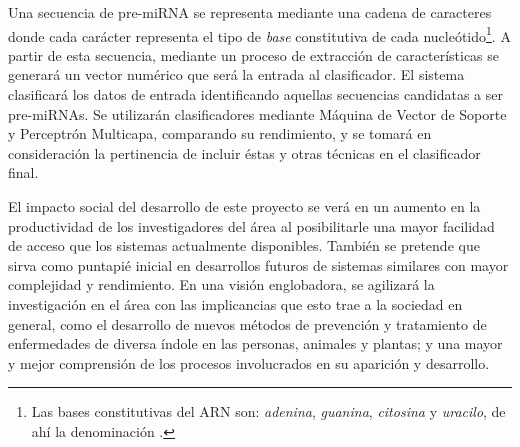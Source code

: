\documentclass[12pt,bibliography=oldstyle,DIV=12,parskip=full-,titlepage]{scrartcl}
\begin{document}
\newpage
Una secuencia de pre-miRNA se representa mediante una cadena de
caracteres  donde cada carácter representa el tipo
de \emph{base} constitutiva de cada nucleótido\footnote{Las bases
  constitutivas del ARN son: \emph{adenina}, \emph{guanina},
  \emph{citosina} y \emph{uracilo}, de ahí la denominación .}.
A partir de esta secuencia, mediante un proceso de extracción de
características se generará un vector numérico que será la entrada al
clasificador.  El sistema clasificará los datos de entrada
identificando aquellas secuencias candidatas a ser pre-miRNAs.  Se
utilizarán clasificadores mediante Máquina de Vector de Soporte y
Perceptrón Multicapa, comparando su rendimiento, y se tomará en
consideración la pertinencia de incluir éstas y otras técnicas en el
clasificador final.



%
El impacto social del desarrollo de este proyecto se verá en un
aumento en la productividad de los investigadores del área al
posibilitarle una mayor facilidad de acceso que los sistemas actualmente
disponibles. También se pretende que sirva como puntapié inicial en
desarrollos futuros de sistemas similares con mayor complejidad y
rendimiento. En una visión englobadora, se agilizará la investigación
en el área con las implicancias que esto trae a la sociedad en
general, como el desarrollo de nuevos métodos de prevención y
tratamiento de enfermedades de diversa índole en las personas,
animales y plantas; y una mayor y mejor comprensión de los procesos
involucrados en su aparición y desarrollo.
\end{document}
